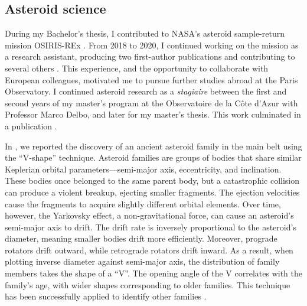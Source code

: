     \subsection*{Asteroid science}

        During my Bachelor's thesis, I contributed to NASA's asteroid sample-return mission OSIRIS-REx \citep{2017SSRv..212..925L}. From 2018 to 2020, I continued working on the mission as a research assistant, producing two first-author publications \citep{2021E&SS....800613F,2021Icar..36814579F} and contributing to several others \citep{2020A&A...637L...4B,2020Sci...370.3557K,2021Icar..35814183Z,2021Icar..35714252D,2021PSJ.....2..117L,2021M&PS...56.1173S,2022SSRv..218....5G,2023Icar..40015563C}. This experience, and the opportunity to collaborate with European colleagues, motivated me to pursue further studies abroad at the Paris Observatory. I continued asteroid research as a \textit{stagiaire} between the first and second years of my master's program at the Observatoire de la Côte d'Azur with Professor Marco Delbo, and later for my master's thesis. This work culminated in a publication \citep{2023A&A...676A...5F}.

        In \citet{2023A&A...676A...5F}, we reported the discovery of an ancient asteroid family in the main belt using the ``V-shape'' technique. Asteroid families are groups of bodies that share similar Keplerian orbital parameters—semi-major axis, eccentricity, and inclination. These bodies once belonged to the same parent body, but a catastrophic collision can produce a violent breakup, ejecting smaller fragments. The ejection velocities cause the fragments to acquire slightly different orbital elements. Over time, however, the Yarkovsky effect, a non-gravitational force, can cause an asteroid's semi-major axis to drift. The drift rate is inversely proportional to the asteroid's diameter, meaning smaller bodies drift more efficiently. Moreover, prograde rotators drift outward, while retrograde rotators drift inward. As a result, when plotting inverse diameter against semi-major axis, the distribution of family members takes the shape of a ``V''. The opening angle of the V correlates with the family's age, with wider shapes corresponding to older families. This technique has been successfully applied to identify other families \citep{2019A&A...624A..69D,2017Sci...357.1026D}.  

